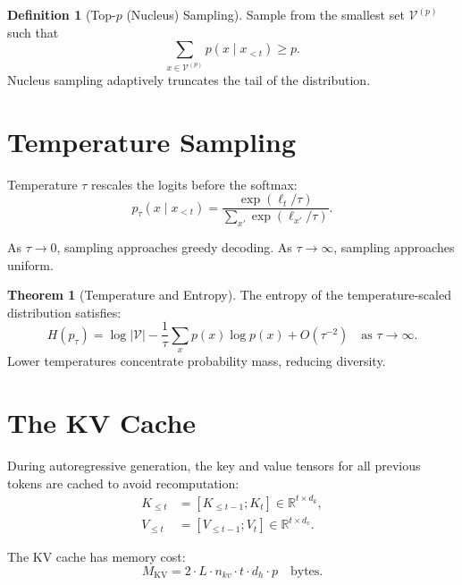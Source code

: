 \documentclass[11pt,a4paper]{book}
\theoremstyle{definition}
\newtheorem{definition}{Definition}[chapter]
\newtheorem{theorem}{Theorem}[chapter]
\begin{document}
\begin{definition}[Top-$p$ (Nucleus) Sampling]
	Sample from the smallest set $\mathcal{V}^{(p)}$ such that
	\begin{equation}
		\sum_{x \in \mathcal{V}^{(p)}} p(x \mid x_{<t}) \geq p.
	\end{equation}
	Nucleus sampling adaptively truncates the tail of the distribution.
\end{definition}

\section{Temperature Sampling}

Temperature $\tau$ rescales the logits before the softmax:
\begin{equation}
	p_\tau(x \mid x_{<t}) = \frac{\exp(\ell_t / \tau)}{\sum_{x'} \exp(\ell_{x'} / \tau)}.
\end{equation}

As $\tau \to 0$, sampling approaches greedy decoding. As $\tau \to \infty$, sampling approaches uniform.

\begin{theorem}[Temperature and Entropy]
	The entropy of the temperature-scaled distribution satisfies:
	\begin{equation}
		H(p_\tau) = \log|\mathcal{V}| - \frac{1}{\tau} \sum_x p(x) \log p(x) + O(\tau^{-2}) \quad \text{as } \tau \to \infty.
	\end{equation}
	Lower temperatures concentrate probability mass, reducing diversity.
\end{theorem}

\section{The KV Cache}

During autoregressive generation, the key and value tensors for all previous tokens are cached to avoid recomputation:
\begin{align}
	K_{\leq t} & = [K_{\leq t-1}; K_t] \in \mathbb{R}^{t \times d_k}, \\
	V_{\leq t} & = [V_{\leq t-1}; V_t] \in \mathbb{R}^{t \times d_v}.
\end{align}

The KV cache has memory cost:
\begin{equation}
	M_{\text{KV}} = 2 \cdot L \cdot n_{kv} \cdot t \cdot d_h \cdot p \quad \text{bytes}.
\end{equation}
\end{document}

